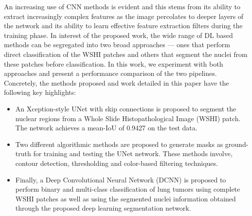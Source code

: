 \documentclass{comjnl}
\begin{document}
An increasing use of CNN methods is evident and this stems from its ability to extract increasingly complex features as the image percolates to deeper layers of the network and its ability to learn effective feature extraction filters during the training phase. In interest of the proposed work, the wide range of DL based methods can be segregated into two broad approaches --- ones that perform direct classification of the WSHI patches and others that segment the nuclei from these patches before classification. In this work, we experiment with both approaches and present a performance comparison of the two pipelines. Concretely, the methods proposed and work detailed in this paper have the following key highlights:
\begin{itemize}
    \item An Xception-style UNet with skip connections is proposed to segment the nuclear regions from a Whole Slide Histopathological Image (WSHI) patch. The network achieves a mean-IoU of 0.9427 on the test data.
    \item Two different algorithmic methods are proposed to generate masks as ground-truth for training and testing the UNet network. These methods involve, contour detection, thresholding and color-based filtering techniques.
    \item Finally, a Deep Convolutional Neural Network (DCNN) is proposed to perform binary and multi-class classification of lung tumors using complete WSHI patches as well as using the segmented nuclei information obtained through the proposed deep learning segmentation network.
\end{itemize}








\end{document}

